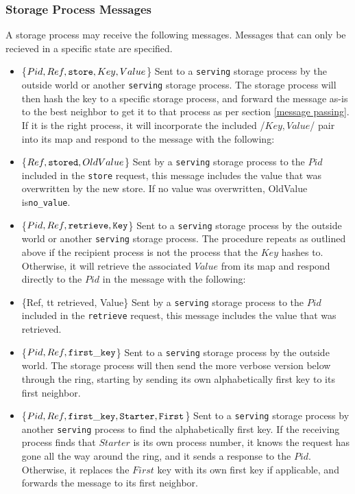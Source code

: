 \documentclass[a4paper]{article}
\begin{document}
\subsubsection{Storage Process Messages}

A storage process may receive the following messages. Messages that can only be recieved in a specific state are specified.

\begin{itemize}
\item\{$Pid, Ref, {\tt store}, Key, Value$\} Sent to a {\tt serving} storage process by the outside world or another {\tt serving} storage process. The storage process will then hash the key to a specific storage process, and forward the message as-is to the best neighbor to get it to that process as per section \ref{message passing}. If it is the right process, it will incorporate the included /{$Key, Value$/} pair into its map and respond to the message with the following:
\item\{$Ref, {\tt stored}, OldValue$\} Sent by a {\tt serving} storage process to the $Pid$ included in the {\tt store} request, this message includes the value that was overwritten by the new store. If no value was overwritten, OldValue is{\tt no\_value}.
\item\{$Pid, Ref, {\tt retrieve, Key}$\} Sent to a {\tt serving} storage process by the outside world or another {\tt serving} storage process. The procedure repeats as outlined above if the recipient process is not the process that the $Key$ hashes to. Otherwise, it will retrieve the associated $Value$ from its map and respond directly to the $Pid$ in the message with the following:
\item\{Ref, {tt retrieved}, Value\} Sent by a {\tt serving} storage process to the $Pid$ included in the {\tt retrieve} request, this message includes the value that was retrieved.
\item\{$Pid, Ref, {\tt first\_key}$\} Sent to a {\tt serving} storage process by the outside world. The storage process will then send the more verbose version below through the ring, starting by sending its own alphabetically first key to its first neighbor.
\item\{$Pid, Ref, {\tt first\_key, Starter, First}$\} Sent to a {\tt serving} storage process by another {\tt serving} process to find the alphabetically first key. If the receiving process finds that $Starter$ is its own process number, it knows the request has gone all the way around the ring, and it sends a response to the $Pid$. Otherwise, it replaces the $First$ key with its own first key if applicable, and forwards the message to its first neighbor.

\end{itemize}
\end{document}
